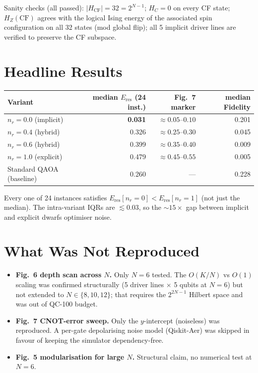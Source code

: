 \documentclass[11pt]{article}
\begin{document}
Sanity checks (all passed): $|H_{\mathrm{CF}}|=32=2^{N-1}$; $H_C=0$ on
every CF state; $H_Z(\mathrm{CF})$ agrees with the logical Ising energy
of the associated spin configuration on all 32 states (mod global flip);
all 5 implicit driver lines are verified to preserve the CF subspace.

\section{Headline Results}
\begin{table}[h]
\centering\small
\begin{tabular}{lrrr}
\toprule
Variant & median $E_{\mathrm{res}}$ (24 inst.) & Fig.~7 marker & median Fidelity \\
\midrule
$n_r=0.0$ (implicit)      & \textbf{0.031} & $\approx 0.05$--$0.10$ & 0.201 \\
$n_r=0.4$ (hybrid)        & 0.326          & $\approx 0.25$--$0.30$ & 0.045 \\
$n_r=0.6$ (hybrid)        & 0.399          & $\approx 0.35$--$0.40$ & 0.009 \\
$n_r=1.0$ (explicit)      & 0.479          & $\approx 0.45$--$0.55$ & 0.005 \\
Standard QAOA (baseline)  & 0.260          & --- & 0.228 \\
\bottomrule
\end{tabular}
\end{table}

Every one of 24 instances satisfies
$E_{\mathrm{res}}[n_r{=}0] < E_{\mathrm{res}}[n_r{=}1]$ (not just the
median). The intra-variant IQRs are $\lesssim 0.03$, so the $\sim 15\times$
gap between implicit and explicit dwarfs optimiser noise.

\section{What Was Not Reproduced}
\begin{itemize}
\item \textbf{Fig.~6 depth scan across $N$.} Only $N{=}6$ tested. The
$O(K/N)$ vs $O(1)$ scaling was confirmed structurally (5 driver lines
$\times$ 5 qubits at $N{=}6$) but not extended to $N\in\{8,10,12\}$;
that requires the $2^{2N-1}$ Hilbert space and was out of QC-100 budget.
\item \textbf{Fig.~7 CNOT-error sweep.} Only the $y$-intercept
(noiseless) was reproduced. A per-gate depolarising noise model
(Qiskit-Aer) was skipped in favour of keeping the simulator
dependency-free.
\item \textbf{Fig.~5 modularisation for large $N$.} Structural claim, no
numerical test at $N{=}6$.
\end{itemize}
\end{document}
